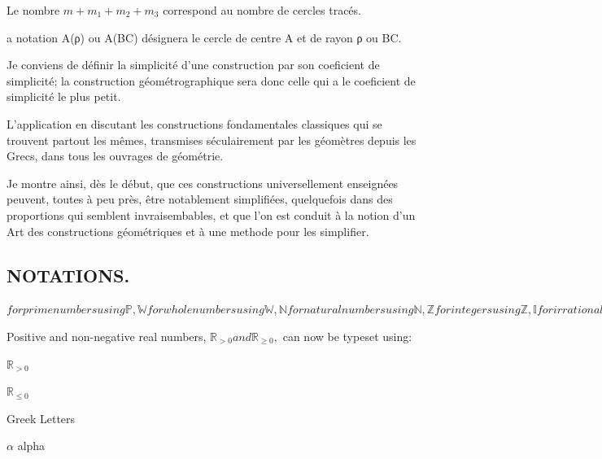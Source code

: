 \documentclass[12pt,a4paper,twocolumn]{book} %
\begin{document}
Le nombre $ m + m_{1} + m_{2} + m_{3}$ correspond au nombre de cercles tracés.


a notation A(ρ) ou A(BC) désignera le cercle de centre A et de rayon ρ ou BC.


Je conviens de définir la simplicité d'une construction par son coeficient de simplicité; la construction géométrographique sera donc celle qui a le coeficient de simplicité le plus petit.




L'application en discutant les constructions fondamentales classiques qui se trouvent partout
les mêmes, transmises séculairement par les géomètres depuis
les Grecs, dans tous les ouvrages de géométrie.


Je montre ainsi, dès le début, que ces constructions universellement enseignées peuvent, toutes à peu près, être notablement simplifiées, quelquefois dans des proportions qui semblent invraisembables, et que l'on est conduit à la notion d'un Art des constructions géométriques et à une methode pour les simplifier.

\subsection{NOTATIONS.}
$ for prime numbers using \mathbb{P},
\mathbb{W} for whole numbers using \mathbb{W},
\mathbb{N} for natural numbers using \mathbb{N},
\mathbb{Z} for integers using \mathbb{Z},
\mathbb{I} for irrational numbers using \mathbb{I},
\mathbb{Q} for rational numbers using \mathbb{Q},
\mathbb{R} for real numbers using \mathbb{R} and
\mathbb{C} for complex numbers using \mathbb{C}.$

Positive and non-negative real numbers, $\mathbb{R}_{>0} and \mathbb{R}_{\geq0},$ can now be typeset using:


$\mathbb{R}_{>0}$

$\mathbb{R}_{\leq 0}$

Greek Letters

$\alpha$ 	alpha

\end{document}
